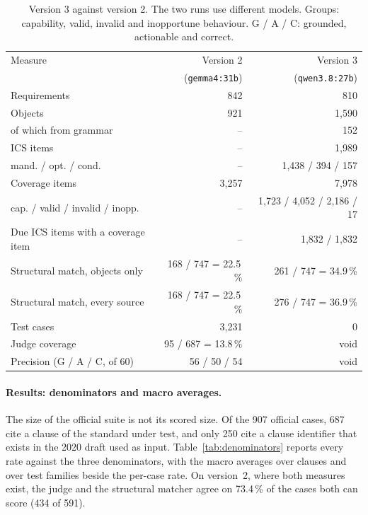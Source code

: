 \begin{table}[t]
  \centering
  \caption{Version 3 against version 2. The two runs use different
    models. Groups: capability, valid, invalid and inopportune behaviour.
    G / A / C: grounded, actionable and correct.}
  \label{tab:conformance-run}
  \small\setlength{\tabcolsep}{4pt}
  \begin{tabular}{lrr}
    \toprule
    Measure & Version 2 & Version 3 \\
            & (\texttt{gemma4:31b}) & (\texttt{qwen3.8:27b}) \\
    \midrule
    Requirements                  & 842   & 810 \\
    Objects                       & 921   & 1,590 \\
    \quad of which from grammar   & --    & 152 \\
    ICS items                     & --    & 1,989 \\
    \quad mand. / opt. / cond. & -- & 1,438 / 394 / 157 \\
    Coverage items                & 3,257 & 7,978 \\
    \quad cap. / valid / invalid / inopp. & -- & 1,723 / 4,052 / 2,186 / 17 \\
    Due ICS items with a coverage item & -- & 1,832 / 1,832 \\
    \midrule
    Structural match, objects only & 168 / 747 = 22.5\,\% & 261 / 747 = 34.9\,\% \\
    Structural match, every source & 168 / 747 = 22.5\,\% & 276 / 747 = 36.9\,\% \\
    \midrule
    Test cases                    & 3,231 & 0 \\
    Judge coverage                & 95 / 687 = 13.8\,\% & void \\
    Precision (G / A / C, of 60) & 56 / 50 / 54 & void \\
    \bottomrule
  \end{tabular}
\end{table}

\paragraph{Results: denominators and macro averages.}
The size of the official suite is not its scored size. Of the 907 official
cases, 687 cite a clause of the standard under test, and only 250 cite a
clause identifier that exists in the 2020 draft used as input.
Table~\ref{tab:denominators} reports every rate against the three
denominators, with the macro averages over clauses and over test families
beside the per-case rate. On version~2, where both measures exist, the judge
and the structural matcher agree on 73.4\,\% of the cases both can score
(434 of 591).

